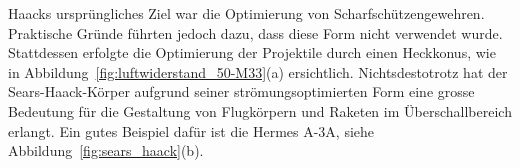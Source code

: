 Haacks ursprüngliches Ziel war die Optimierung von Scharfschützengewehren. 
Praktische Gründe führten jedoch dazu, dass diese 
Form nicht verwendet wurde. 
Stattdessen erfolgte die Optimierung der Projektile 
durch einen Heckkonus, wie in Abbildung~\ref{fig:luftwiderstand_50-M33}(a) ersichtlich.
Nichtsdestotrotz hat der Sears-Haack-Körper aufgrund 
seiner strömungsoptimierten Form eine grosse Bedeutung 
für die Gestaltung von Flugkörpern und Raketen
im Überschallbereich erlangt.
Ein gutes Beispiel dafür ist die Hermes A-3A, siehe Abbildung~\ref{fig:sears_haack}(b).